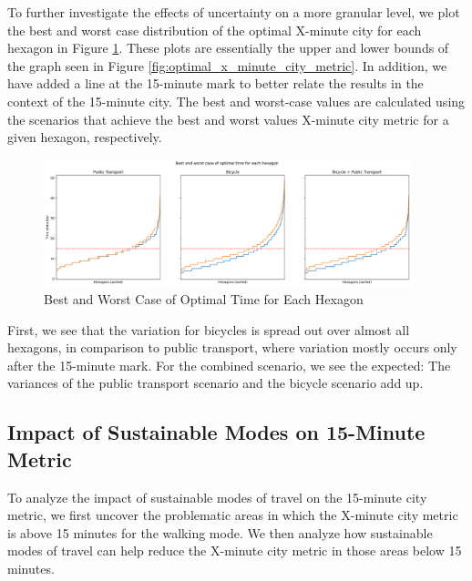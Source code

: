 To further investigate the effects of uncertainty on a more granular level, we plot the best and worst case distribution of the optimal X-minute city for each hexagon in Figure \ref{fig:best_and_worst_case_of_optimal_time_for_each_hexagon}.
These plots are essentially the upper and lower bounds of the graph seen in Figure \ref{fig:optimal_x_minute_city_metric}.
In addition, we have added a line at the 15-minute mark to better relate the results in the context of the 15-minute city.
The best and worst-case values are calculated using the scenarios that achieve the best and worst values X-minute city metric for a given hexagon, respectively.
\begin{figure}
  \begin{center}
    \includegraphics[width=0.95\textwidth]{Figures/results/uncertainty/optimal_best_worst_case}
  \end{center}
  \caption{Best and Worst Case of Optimal Time for Each Hexagon}
  \label{fig:best_and_worst_case_of_optimal_time_for_each_hexagon}
\end{figure}
First, we see that the variation for bicycles is spread out over almost all hexagons, in comparison to public transport, where variation mostly occurs only after the 15-minute mark.
For the combined scenario, we see the expected: The variances of the public transport scenario and the bicycle scenario add up.

\subsection{Impact of Sustainable Modes on 15-Minute Metric}
\label{subsec:impact_of_sustainable_modes_on_15_minute_metric}

To analyze the impact of sustainable modes of travel on the 15-minute city metric, we first uncover the problematic areas in which the X-minute city metric is above 15 minutes for the walking mode.
We then analyze how sustainable modes of travel can help reduce the X-minute city metric in those areas below 15 minutes.

